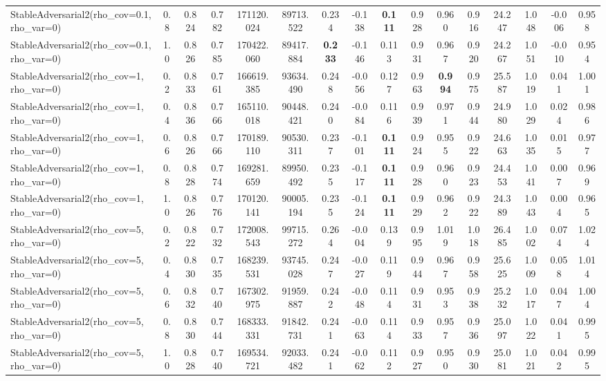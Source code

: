 \documentclass[11pt]{article}
\theoremstyle{plain}
\theoremstyle{definition}
\newcommand{\1}{\mathbf{1}}
\begin{document}
\begin{table}[h]
{\begin{tabular}{lccccccccccccccc}
StableAdversarial2(rho\_cov=0.1, rho\_var=0) & 0.8 & 0.824 & 0.782 & 171120.024 & 89713.522 & 0.234 & -0.138 & \textbf{0.111} & 0.928 & 0.960 & 0.916 & 24.247 & 1.048 & -0.006 & 0.958 \\
StableAdversarial2(rho\_cov=0.1, rho\_var=0) & 1.0 & 0.826 & 0.785 & 170422.060 & 89417.884 & \textbf{0.233} & -0.146 & 0.113 & 0.931 & 0.967 & 0.920 & 24.267 & 1.051 & -0.010 & 0.954 \\
StableAdversarial2(rho\_cov=1, rho\_var=0) & 0.2 & 0.833 & 0.761 & 166619.385 & 93634.490 & 0.248 & -0.056 & 0.127 & 0.963 & \textbf{0.994} & 0.975 & 25.587 & 1.019 & 0.041 & 1.001 \\
StableAdversarial2(rho\_cov=1, rho\_var=0) & 0.4 & 0.836 & 0.766 & 165110.018 & 90448.421 & 0.240 & -0.084 & 0.116 & 0.939 & 0.971 & 0.944 & 24.980 & 1.029 & 0.024 & 0.986 \\
StableAdversarial2(rho\_cov=1, rho\_var=0) & 0.6 & 0.826 & 0.766 & 170189.110 & 90530.311 & 0.237 & -0.101 & \textbf{0.111} & 0.924 & 0.955 & 0.922 & 24.663 & 1.035 & 0.015 & 0.977 \\
StableAdversarial2(rho\_cov=1, rho\_var=0) & 0.8 & 0.828 & 0.774 & 169281.659 & 89950.492 & 0.235 & -0.117 & \textbf{0.111} & 0.928 & 0.960 & 0.923 & 24.453 & 1.041 & 0.007 & 0.969 \\
StableAdversarial2(rho\_cov=1, rho\_var=0) & 1.0 & 0.826 & 0.776 & 170120.141 & 90005.194 & 0.235 & -0.124 & \textbf{0.111} & 0.929 & 0.962 & 0.922 & 24.389 & 1.043 & 0.004 & 0.965 \\
StableAdversarial2(rho\_cov=5, rho\_var=0) & 0.2 & 0.822 & 0.732 & 172008.543 & 99715.272 & 0.264 & -0.004 & 0.139 & 0.995 & 1.019 & 1.018 & 26.485 & 1.002 & 0.074 & 1.024 \\
StableAdversarial2(rho\_cov=5, rho\_var=0) & 0.4 & 0.830 & 0.735 & 168239.531 & 93745.028 & 0.247 & -0.027 & 0.119 & 0.944 & 0.967 & 0.958 & 25.625 & 1.009 & 0.058 & 1.014 \\
StableAdversarial2(rho\_cov=5, rho\_var=0) & 0.6 & 0.832 & 0.740 & 167302.975 & 91959.887 & 0.242 & -0.048 & 0.114 & 0.931 & 0.953 & 0.938 & 25.232 & 1.017 & 0.047 & 1.004 \\
StableAdversarial2(rho\_cov=5, rho\_var=0) & 0.8 & 0.830 & 0.744 & 168333.331 & 91842.731 & 0.241 & -0.063 & 0.114 & 0.933 & 0.957 & 0.936 & 25.097 & 1.022 & 0.041 & 0.995 \\
StableAdversarial2(rho\_cov=5, rho\_var=0) & 1.0 & 0.828 & 0.740 & 169534.721 & 92033.482 & 0.241 & -0.062 & 0.112 & 0.927 & 0.950 & 0.930 & 25.081 & 1.021 & 0.042 & 0.995 \\

\end{tabular}}
\end{table}
\end{document}
